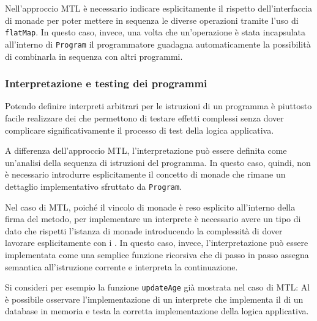 Nell'approccio MTL è necessario indicare esplicitamente il rispetto dell'interfaccia di monade per poter mettere in sequenza le diverse operazioni tramite l'uso di \lstinline{flatMap}. In questo caso, invece, una volta che un'operazione è stata incapsulata all'interno di \lstinline{Program} il programmatore guadagna automaticamente la possibilità di combinarla in sequenza con altri programmi.

\subsubsection{Interpretazione e testing dei programmi}
Potendo definire interpreti arbitrari per le istruzioni di un programma è piuttosto facile realizzare dei  che permettono di testare effetti complessi senza dover complicare significativamente il processo di test della logica applicativa.

A differenza dell'approccio MTL, l'interpretazione può essere definita come un'analisi della sequenza di istruzioni del programma.
In questo caso, quindi, non è necessario introdurre esplicitamente il concetto di monade che rimane un dettaglio implementativo sfruttato da \lstinline{Program}.

Nel caso di MTL, poiché il vincolo di monade è reso esplicito all'interno della firma del metodo, per implementare un interprete è necessario avere un tipo di dato che rispetti l'istanza di monade introducendo la complessità di dover lavorare esplicitamente con i .
In questo caso, invece, l'interpretazione può essere implementata come una semplice funzione ricorsiva che di passo in passo assegna semantica all'istruzione corrente e interpreta la continuazione.

Si consideri per esempio la funzione \lstinline{updateAge} già mostrata nel caso di MTL:
Al  è possibile osservare l'implementazione di un interprete che implementa il  di un database in memoria e testa la corretta implementazione della logica applicativa.

